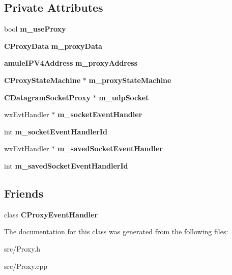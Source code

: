 \subsection*{Private Attributes}
\begin{DoxyCompactItemize}
\item 
bool {\bfseries m\_\-useProxy}\label{classCProxySocket_ab8e4cbb9c5a2189504ccf1b8c5eb424a}

\item 
{\bf CProxyData} {\bfseries m\_\-proxyData}\label{classCProxySocket_a969fcbae1d22079fb0da0254010ccfb5}

\item 
{\bf amuleIPV4Address} {\bfseries m\_\-proxyAddress}\label{classCProxySocket_a6060fcaf25f668e10405b2df118e6397}

\item 
{\bf CProxyStateMachine} $\ast$ {\bfseries m\_\-proxyStateMachine}\label{classCProxySocket_aea92d15f49aa8ecdb020265fcd417e18}

\item 
{\bf CDatagramSocketProxy} $\ast$ {\bfseries m\_\-udpSocket}\label{classCProxySocket_ace570bd67814b6dd72f22f1d4400c178}

\item 
wxEvtHandler $\ast$ {\bfseries m\_\-socketEventHandler}\label{classCProxySocket_a13fb46a495d278a2d49cbc1a3c80fb8c}

\item 
int {\bfseries m\_\-socketEventHandlerId}\label{classCProxySocket_a490dec35046c9ca024f7687a6538995d}

\item 
wxEvtHandler $\ast$ {\bfseries m\_\-savedSocketEventHandler}\label{classCProxySocket_a5b4ee327b021e07cf5c8dd572a30830c}

\item 
int {\bfseries m\_\-savedSocketEventHandlerId}\label{classCProxySocket_adad4b3bb091f34b7ed6c858b9f9bb4d3}

\end{DoxyCompactItemize}
\subsection*{Friends}
\begin{DoxyCompactItemize}
\item 
class {\bf CProxyEventHandler}\label{classCProxySocket_a4a9c4979d59b5a0635dcbd1cbf893216}

\end{DoxyCompactItemize}


The documentation for this class was generated from the following files:\begin{DoxyCompactItemize}
\item 
src/Proxy.h\item 
src/Proxy.cpp\end{DoxyCompactItemize}
